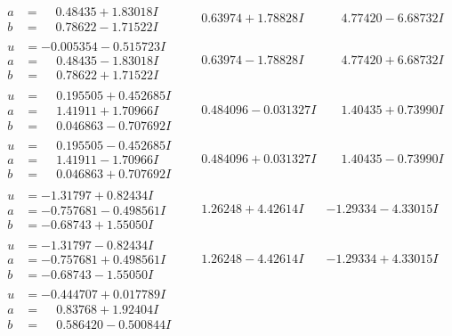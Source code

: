 \documentclass[1p]{elsarticle_modified}
\theoremstyle{definition}
\begin{document}
$$\begin{array}{c|c|c}
\begin{aligned}
a &= \phantom{-}0.48435 + 1.83018 I \\
b &= \phantom{-}0.78622 - 1.71522 I\end{aligned}
 & \phantom{-}0.63974 + 1.78828 I & \phantom{-}4.77420 - 6.68732 I \\ \hline\begin{aligned}
u &= -0.005354 - 0.515723 I \\
a &= \phantom{-}0.48435 - 1.83018 I \\
b &= \phantom{-}0.78622 + 1.71522 I\end{aligned}
 & \phantom{-}0.63974 - 1.78828 I & \phantom{-}4.77420 + 6.68732 I \\ \hline\begin{aligned}
u &= \phantom{-}0.195505 + 0.452685 I \\
a &= \phantom{-}1.41911 + 1.70966 I \\
b &= \phantom{-}0.046863 - 0.707692 I\end{aligned}
 & \phantom{-}0.484096 - 0.031327 I & \phantom{-}1.40435 + 0.73990 I \\ \hline\begin{aligned}
u &= \phantom{-}0.195505 - 0.452685 I \\
a &= \phantom{-}1.41911 - 1.70966 I \\
b &= \phantom{-}0.046863 + 0.707692 I\end{aligned}
 & \phantom{-}0.484096 + 0.031327 I & \phantom{-}1.40435 - 0.73990 I \\ \hline\begin{aligned}
u &= -1.31797 + 0.82434 I \\
a &= -0.757681 - 0.498561 I \\
b &= -0.68743 + 1.55050 I\end{aligned}
 & \phantom{-}1.26248 + 4.42614 I & -1.29334 - 4.33015 I \\ \hline\begin{aligned}
u &= -1.31797 - 0.82434 I \\
a &= -0.757681 + 0.498561 I \\
b &= -0.68743 - 1.55050 I\end{aligned}
 & \phantom{-}1.26248 - 4.42614 I & -1.29334 + 4.33015 I \\ \hline\begin{aligned}
u &= -0.444707 + 0.017789 I \\
a &= \phantom{-}0.83768 + 1.92404 I \\
b &= \phantom{-}0.586420 - 0.500844 I\end{aligned}

\end{array}$$
\end{document}

